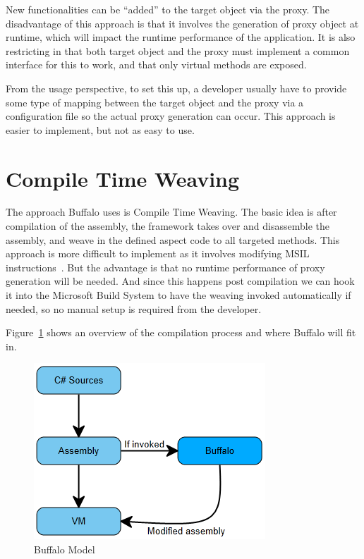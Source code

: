New functionalities can be “added” to the target object via the proxy. The disadvantage of this approach is that it involves the generation of proxy object at runtime, which will impact the runtime performance of the application. It is also restricting in that both target object and the proxy must implement a common interface for this to work, and that only virtual methods are exposed.

From the usage perspective, to set this up, a developer usually have to provide some type of mapping between the target object and the proxy via a configuration file so the actual proxy generation can occur. This approach is easier to implement, but not as easy to use.

\section{Compile Time Weaving}

The approach Buffalo uses is Compile Time Weaving. The basic idea is after compilation of the assembly, the framework takes over and disassemble the assembly, and weave in the defined aspect code to all targeted methods. This approach is more difficult to implement as it involves modifying MSIL instructions~\cite{rewrite_msil}. But the advantage is that no runtime performance of proxy generation will be needed. And since this happens post compilation we can hook it into the Microsoft Build System to have the weaving invoked automatically if needed, so no manual setup is required from the developer.

Figure~\ref{buffalo_model} shows an overview of the compilation process and where Buffalo will fit in.

\begin{figure}[H]
  \includegraphics[scale=1.0]{BuffaloOverview.PNG}
  \centering
  \caption{Buffalo Model\label{buffalo_model}}
\end{figure}

